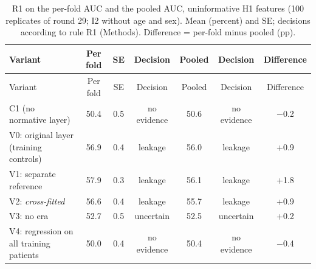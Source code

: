 {\scriptsize
\begin{longtable}{lcccccc}
\caption{R1 on the per-fold AUC and the pooled AUC, uninformative H1 features (100 replicates of round 29; I2 without age and sex). Mean (percent) and SE; decisions according to rule R1 (Methods). Difference = per-fold minus pooled (pp).}\label{tab:s2_p46}\\
\toprule
Variant & Per fold & SE & Decision & Pooled & Decision & Difference \\
\midrule
\endfirsthead
\toprule
Variant & Per fold & SE & Decision & Pooled & Decision & Difference \\
\midrule
\endhead
\bottomrule
\endfoot
C1 (no normative layer) & 50.4 & 0.5 & no evidence & 50.6 & no evidence & $-$0.2 \\
V0: original layer (training controls) & 56.9 & 0.4 & leakage & 56.0 & leakage & +0.9 \\
V1: separate reference & 57.9 & 0.3 & leakage & 56.1 & leakage & +1.8 \\
V2: \textit{cross-fitted} & 56.6 & 0.4 & leakage & 55.7 & leakage & +0.9 \\
V3: no era & 52.7 & 0.5 & uncertain & 52.5 & uncertain & +0.2 \\
V4: regression on all training patients & 50.0 & 0.4 & no evidence & 50.4 & no evidence & $-$0.4 \\
\end{longtable}
}
